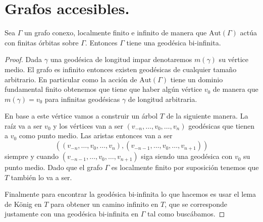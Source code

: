 \documentclass[tesis.tex]{subfiles}
\newcommand{\aut}{\text{Aut}}
\begin{document}
\section{Grafos accesibles.}

\begin{lema}\label{lema_geodesica_biinfinita}
	Sea $\Gamma$ un grafo conexo, localmente finito e infinito de manera que $\aut(\Gamma)$ actúa con finitas órbitas sobre $\Gamma$.
	Entonces $\Gamma$ tiene una geodésica bi-infinita.
\end{lema}
\begin{proof}
	Dada $\gamma$ una geodésica de longitud impar denotaremos $m(\gamma)$ su vértice medio.	
	El grafo es infinito entonces existen geodésicas de cualquier tamaño arbitrario.
	En particular como la acción de $\aut(\Gamma)$ tiene un dominio fundamental finito obtenemos que tiene que haber algún vértice $v_0$ de manera que $m(\gamma) = v_0$ para infinitas geodésicas $\gamma$ de longitud arbitraria.
	
	En base a este vértice vamos a construir un árbol $T$ de la siguiente manera.
	La raíz va a ser $v_0$ y los vértices van a ser $(v_{-n},\dots, v_0,\dots,v_n)$ geodésicas que tienen a $v_0$ como punto medio.
	Las aristas entonces van a ser 
	\[
		((v_{-n},\dots, v_0,\dots,v_n), (v_{-n-1},\dots, v_0,\dots,v_{n+1}))
	\]
	siempre y cuando $(v_{-n-1},\dots, v_0,\dots,v_{n+1})$ siga siendo una geodésica con $v_0$ su punto medio.
	Dado que el grafo $\Gamma$ es localmente finito por suposición tenemos que $T$ también lo va a ser.
	
	Finalmente para encontrar la geodésica bi-infinita lo que hacemos es usar el lema de König en $T$ para obtener un camino infinito en $T$, que se corresponde justamente con una geodésica bi-infinita en $\Gamma$ tal como buscábamos.
	
\end{proof}
\end{document}
